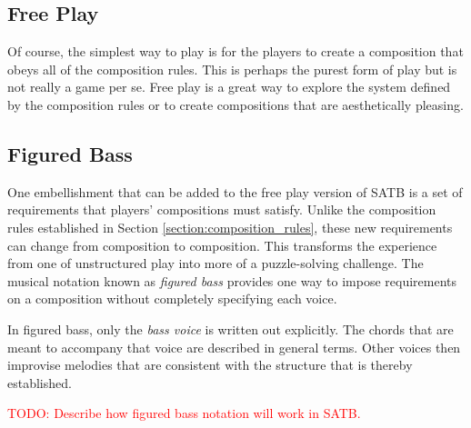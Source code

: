 \documentclass{scrartcl}
\numberwithin{example}{section}
\begin{document}
\subsection{Free Play}
Of course, the simplest way to play is for the players to create a composition that obeys all
of the composition rules.  This is perhaps the purest form of play but is not really a game
per se. Free play is a great way to explore the system defined by the composition rules
or to create compositions that are aesthetically pleasing.

\subsection{Figured Bass}
One embellishment that can be added to the free play version of SATB is a set of 
requirements that players' compositions must satisfy.  Unlike the composition rules
established in Section \ref{section:composition_rules}, these new requirements can change
from composition to composition.
This transforms the experience from one of unstructured play into more of a
puzzle-solving challenge.
The musical notation known as \emph{figured bass} provides one way to impose
requirements on a composition without completely specifying each voice.

In figured bass, only the \emph{bass voice} is written out explicitly.
The chords that are meant to accompany that voice are described in general terms.
Other voices then improvise melodies that are consistent with the structure that
is thereby established. 

\textcolor{red}{TODO: Describe how figured bass notation will work in SATB.}
\end{document}
